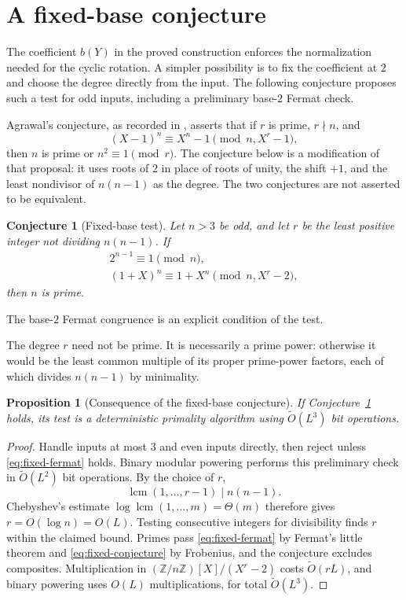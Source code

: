 \documentclass[11pt]{article}
\newtheorem{proposition}[theorem]{Proposition}
\newtheorem{conjecture}[theorem]{Conjecture}
\theoremstyle{definition}
\theoremstyle{remark}
\newcommand{\Z}{\mathbb Z}
\newcommand{\softO}{\widetilde O}
\begin{document}
\section{A fixed-base conjecture}\label{sec:conjecture}

The coefficient $b(Y)$ in the proved construction enforces the
normalization needed for the cyclic rotation. A simpler possibility
is to fix the coefficient at $2$ and choose the degree directly
from the input. The following conjecture proposes such a test for
odd inputs, including a preliminary base-$2$ Fermat check.

Agrawal's conjecture, as recorded in \cite[Conjecture 6.1]{aks}, asserts
that if $r$ is prime, $r\nmid n$, and
\[
 (X-1)^n\equiv X^n-1\pmod{n,X^r-1},
\]
then $n$ is prime or $n^2\equiv1\pmod r$. The conjecture below
is a modification of that proposal: it uses roots of $2$ in place
of roots of unity, the shift $+1$, and the least nondivisor of
$n(n-1)$ as the degree. The two conjectures are not asserted to
be equivalent.

\begin{conjecture}[Fixed-base test]\label{conj:fixed}
Let $n>3$ be odd, and let $r$ be the least positive integer not
dividing $n(n-1)$. If
\begin{gather}
 2^{n-1}\equiv1\pmod n,\label{eq:fixed-fermat}\\
 (1+X)^n\equiv1+X^n\pmod{n,X^r-2},\label{eq:fixed-conjecture}
\end{gather}
then $n$ is prime.
\end{conjecture}

The base-$2$ Fermat congruence is an explicit condition of the test.

The degree $r$ need not be prime. It is necessarily a prime power:
otherwise it would be the least common multiple of its proper
prime-power factors, each of which divides $n(n-1)$ by minimality.

\begin{proposition}[Consequence of the fixed-base conjecture]
If Conjecture~\ref{conj:fixed} holds, its test is a deterministic
primality algorithm using $\softO(L^3)$ bit operations.
\end{proposition}

\begin{proof}
Handle inputs at most $3$ and even inputs directly, then reject
unless \eqref{eq:fixed-fermat} holds. Binary modular powering
performs this preliminary check in $\softO(L^2)$ bit operations.
By the choice of $r$,
\[
 \operatorname{lcm}(1,\ldots,r-1)\mid n(n-1).
\]
Chebyshev's estimate
$\log\operatorname{lcm}(1,\ldots,m)=\Theta(m)$ therefore gives
$r=O(\log n)=O(L)$. Testing consecutive integers for divisibility
finds $r$ within the claimed bound. Primes pass
\eqref{eq:fixed-fermat} by Fermat's little theorem and
\eqref{eq:fixed-conjecture} by Frobenius, and the conjecture
excludes composites. Multiplication in
$(\Z/n\Z)[X]/(X^r-2)$ costs $\softO(rL)$, and binary powering
uses $O(L)$ multiplications, for total $\softO(L^3)$.
\end{proof}
\end{document}
